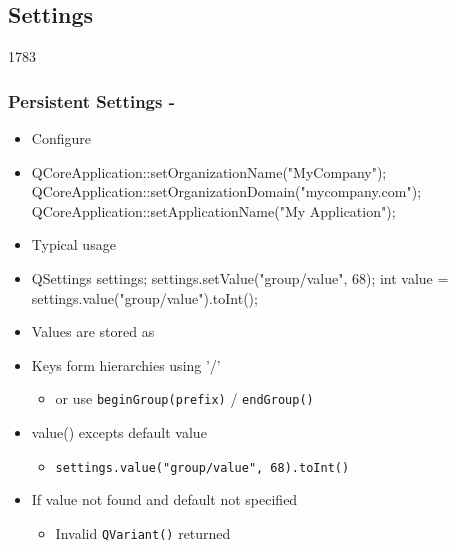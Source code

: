 %
%
%
%

\subsection{Settings}

\begin{slide}[fragile]{1783}\frametitle{Persistent Settings - }
  \begin{itemize}
 \item Configure 
  \item[] \begin{cpp}
QCoreApplication::setOrganizationName("MyCompany");
QCoreApplication::setOrganizationDomain("mycompany.com");
QCoreApplication::setApplicationName("My Application");
  \end{cpp}
 \item Typical usage
  \item[] \begin{cpp}
QSettings settings; 
settings.setValue("group/value", 68);    
int value = settings.value("group/value").toInt();
  \end{cpp}
  \item Values are stored as 
  \item Keys form hierarchies using '/'
   \begin{itemize}
   \item or use \texttt{beginGroup(prefix)} / \texttt{endGroup()} 
   \end{itemize}
 \item value() excepts default value
   \begin{itemize}
   \item \lstinline{settings.value("group/value", 68).toInt()}
 \end{itemize}
   \item If value not found and default not specified
     \begin{itemize}
     \item Invalid \texttt{QVariant()} returned
     \end{itemize}

    \end{itemize}
\end{slide}

